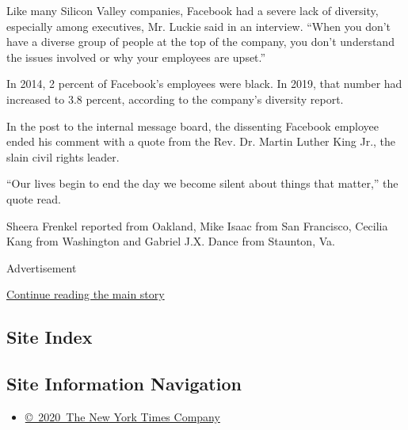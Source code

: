 Like many Silicon Valley companies, Facebook had a severe lack of
diversity, especially among executives, Mr. Luckie said in an interview.
``When you don't have a diverse group of people at the top of the
company, you don't understand the issues involved or why your employees
are upset.''

In 2014, 2 percent of Facebook's employees were black. In 2019, that
number had increased to 3.8 percent, according to the company's
diversity report.

In the post to the internal message board, the dissenting Facebook
employee ended his comment with a quote from the Rev. Dr. Martin Luther
King Jr., the slain civil rights leader.

``Our lives begin to end the day we become silent about things that
matter,'' the quote read.

Sheera Frenkel reported from Oakland, Mike Isaac from San Francisco,
Cecilia Kang from Washington and Gabriel J.X. Dance from Staunton, Va.

Advertisement

\protect\hyperlink{after-bottom}{Continue reading the main story}

\hypertarget{site-index}{%
\subsection{Site Index}\label{site-index}}

\hypertarget{site-information-navigation}{%
\subsection{Site Information
Navigation}\label{site-information-navigation}}

\begin{itemize}
\tightlist
\item
  \href{https://help.nytimes3xbfgragh.onion/hc/en-us/articles/115014792127-Copyright-notice}{©~2020~The
  New York Times Company}
\end{itemize}

